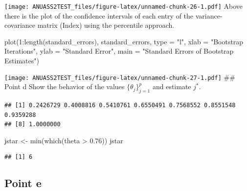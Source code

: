 \documentclass[
]{article}
\newenvironment{Shaded}{\begin{snugshade}}{\end{snugshade}}
\newcommand{\AttributeTok}[1]{\textcolor[rgb]{0.77,0.63,0.00}{#1}}
\newcommand{\DecValTok}[1]{\textcolor[rgb]{0.00,0.00,0.81}{#1}}
\newcommand{\FloatTok}[1]{\textcolor[rgb]{0.00,0.00,0.81}{#1}}
\newcommand{\FunctionTok}[1]{\textcolor[rgb]{0.00,0.00,0.00}{#1}}
\newcommand{\NormalTok}[1]{#1}
\newcommand{\OtherTok}[1]{\textcolor[rgb]{0.56,0.35,0.01}{#1}}
\newcommand{\SpecialCharTok}[1]{\textcolor[rgb]{0.00,0.00,0.00}{#1}}
\newcommand{\StringTok}[1]{\textcolor[rgb]{0.31,0.60,0.02}{#1}}
\begin{document}
\texttt{[image: ANUASS2TEST\_files/figure-latex/unnamed-chunk-26-1.pdf]}
Above there is the plot of the confidence intervals of each entry of the
variance-covariance matrix (Index) using the percentile approach.

\begin{Shaded}
\begin{Highlighting}[]
\FunctionTok{plot}\NormalTok{(}\DecValTok{1}\SpecialCharTok{:}\FunctionTok{length}\NormalTok{(standard\_errors), standard\_errors, }\AttributeTok{type =} \StringTok{"l"}\NormalTok{, }
     \AttributeTok{xlab =} \StringTok{"Bootstrap Iterations"}\NormalTok{, }\AttributeTok{ylab =} \StringTok{"Standard Error"}\NormalTok{, }
     \AttributeTok{main =} \StringTok{"Standard Errors of Bootstrap Estimates"}\NormalTok{)}
\end{Highlighting}
\end{Shaded}

\texttt{[image: ANUASS2TEST\_files/figure-latex/unnamed-chunk-27-1.pdf]}
\#\# Point d Show the behavior of the values \(\{\theta_j\}_{j=1}^p\)
and estimate \(j^*\).

\begin{Shaded}
\end{Shaded}

\begin{verbatim}
## [1] 0.2426729 0.4008816 0.5410761 0.6550491 0.7568552 0.8551548 0.9359288
## [8] 1.0000000
\end{verbatim}

\begin{Shaded}
\begin{Highlighting}[]
\NormalTok{jstar }\OtherTok{\textless{}{-}} \FunctionTok{min}\NormalTok{(}\FunctionTok{which}\NormalTok{(theta }\SpecialCharTok{\textgreater{}} \FloatTok{0.76}\NormalTok{))}
\NormalTok{jstar}
\end{Highlighting}
\end{Shaded}

\begin{verbatim}
## [1] 6
\end{verbatim}

\hypertarget{point-e-1}{%
\subsection{Point e}\label{point-e-1}}
\end{document}

